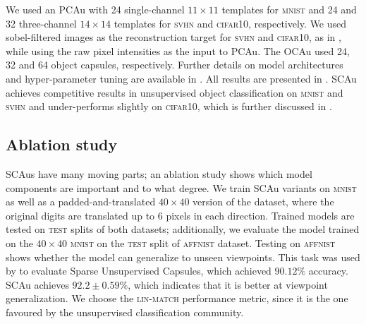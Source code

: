 We used an \gls{PCAu} with 24 single-channel $11\times11$ templates for \textsc{mnist} and 24 and 32 three-channel $14\times14$ templates for \textsc{svhn} and \textsc{cifar10}, respectively.
We used sobel-filtered images as the reconstruction target for \textsc{svhn} and \textsc{cifar10}, as in \cite{Jaiswal}, while using the raw pixel intensities as the input to \gls{PCAu}.
The \gls{OCAu} used 24, 32 and 64 object capsules, respectively.
Further details on model architectures and hyper-parameter tuning are available in .
All results are presented in .
\gls{SCAu} achieves competitive results in unsupervised object classification on \textsc{mnist} and \textsc{svhn} and under-performs slightly on \textsc{cifar10}, which is further discussed in .

\subsection{Ablation study}
\label{sec:ablation}
\gls{SCAu}s have many moving parts;
an ablation study shows which model components are important and to what degree.
We train \gls{SCAu} variants on \textsc{mnist} as well as a padded-and-translated $40\times40$ version of the dataset, where the original digits are translated up to 6 pixels in each direction.
Trained models are tested on \textsc{test} splits of both datasets; additionally, we evaluate the model trained on the $40\times40$ \textsc{mnist} on the \textsc{test} split of \textsc{affnist} dataset.
Testing on \textsc{affnist} shows whether the model can generalize to unseen viewpoints.
This task was used by \cite{Sparsecaps} to evaluate Sparse Unsupervised Capsules, which achieved $90.12\%$ accuracy. \Gls{SCAu} achieves $92.2\pm 0.59\%$, which indicates that it is better at viewpoint generalization.
We choose the \textsc{lin-match} performance metric, since it is the one favoured by the unsupervised classification community.
